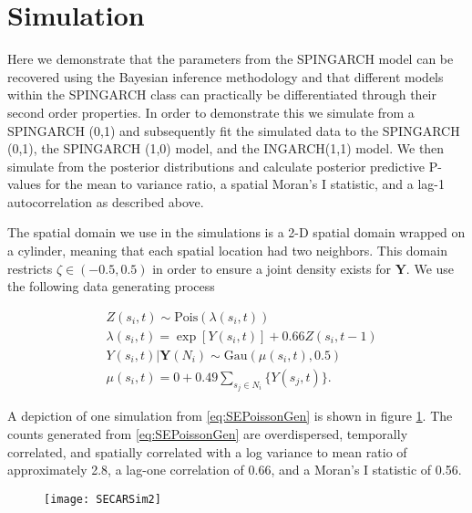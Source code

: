 \documentclass[11pt]{isuthesis}
\begin{document}
\section{Simulation}

Here we demonstrate that the parameters from the SPINGARCH model can be recovered using the Bayesian inference methodology and that different models within the SPINGARCH class can practically be differentiated through their second order properties.  In order to demonstrate this we simulate from a SPINGARCH (0,1) and subsequently fit the simulated data to the SPINGARCH (0,1), the SPINGARCH (1,0) model, and the INGARCH(1,1) model.  We then simulate from the posterior distributions and calculate posterior predictive P-values for the mean to variance ratio, a spatial Moran's I statistic, and a lag-1 autocorrelation as described above.

The spatial domain we use in the simulations is a 2-D spatial domain wrapped on a cylinder, meaning that each spatial location had two neighbors.  This domain restricts $\zeta \in (-0.5,0.5)$ in order to ensure a joint density exists for $\boldsymbol{Y}$.  We use the following data generating process

\begin{align}
	& Z(s_i,t)  \sim\mbox{Pois}(\lambda(s_i,t))\nonumber\\
	& \lambda(s_i,t) =\exp \left[ Y(s_i,t) \right] + 0.66 Z(s_i,t-1)\nonumber\\
	& Y(s_i,t)|\boldsymbol{Y}(N_i)  \sim \mbox{Gau}(\mu(s_i,t),0.5)\nonumber\\ 
	& \mu(s_i,t)  = 0+ 0.49 \sum_{s_j \in N_i} \{Y(s_j,t)\}\label{eq:SEPoissonGen}.
\end{align}

A depiction of one simulation from \eqref{eq:SEPoissonGen} is shown in figure \ref{fig:SEPoissonGen}.  The counts generated from \eqref{eq:SEPoissonGen} are overdispersed, temporally correlated, and spatially correlated  with a log variance to mean ratio of approximately 2.8, a lag-one correlation of 0.66, and a Moran's I statistic of 0.56.


\begin{figure}[!htp]
	\centering
	\texttt{[image: SECARSim2]}
	\label{fig:SEPoissonGen}
\end{figure}
\end{document}
